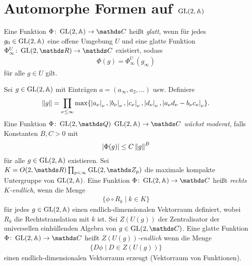 \chapter{Automorphe Formen auf $\operatorname{GL}(2,\mathbb{A})$}

\begin{defi}
Eine Funktion $\Phi \colon \GL(2,\A) \to \C$ heißt \emph{glatt},
wenn für jedes $g_0 \in \operatorname{GL}(2,\mathbb{A})$ eine offene Umgebung $U$ und eine
glatte Funktion $\Phi_\infty^U \colon \GL(2,\R) \to \C$ existiert, sodass
\begin{align*}
\Phi(g)=\Phi_\infty^U(g_\infty)
\end{align*}
für alle $g \in U$ gilt.
\end{defi}

\begin{defi}
Sei $g \in \operatorname{GL}(2,\mathbb{A})$ mit Einträgen $a=(a_\infty,a_2,\dots)$ usw.
Definiere
\begin{align*}
\left\lVert g\right\rVert=\prod_{\nu \leq \infty} \max\{\left\vert a_\nu\right\vert_\nu, \left\vert b_\nu\right\vert_\nu, \left\vert c_\nu\right\vert_\nu, \left\vert d_\nu\right\vert_\nu, \left\vert a_\nu d_\nu-b_\nu c_\nu\right\vert_\nu\}.
\end{align*}
Eine Funktion $\Phi \colon  \GL(2,\Q)\ \GL(2,\A) \to \C$ \emph{wächst moderat}, falls Konstanten $B,C>0$ mit
\begin{align*}
\left\vert\Phi(g)\right\vert \leq C \left\lVert g\right\rVert^B
\end{align*}
für alle $g \in \operatorname{GL}(2,\mathbb{A})$ existieren.
Sei $K=O(2,\R) \prod_{p<\infty} \GL(2,\Z_p)$
die maximale kompakte Untergruppe von $\operatorname{GL}(2,\mathbb{A})$.
Eine Funktion $\Phi \colon \GL(2,\A)\to \C$
heißt \emph{rechts $K$-endlich}, wenn die Menge
\begin{align*}
\{\phi \circ R_k\mid k\in K\}
\end{align*}
für jedes $g \in \operatorname{GL}(2,\mathbb{A})$ einen endlich-dimensionalen Vektorraum definiert, wobei $R_k$ die Rechtstranslation mit $k$ ist.
Sei $Z(U(g))$ der Zentralisator der universellen einhüllenden Algebra von $g \in \GL(2,\C)$.
Eine glatte Funktion $\Phi \colon \GL(2,\A) \to \C$ heißt
\emph{$Z(U(g))$-endlich} wenn die Menge
\begin{align*}
\{D \phi\mid D\in Z(U(g))\}
\end{align*}
einen endlich-dimensionalen Vektorraum erzeugt (Vektorraum von Funktionen).
\end{defi}

